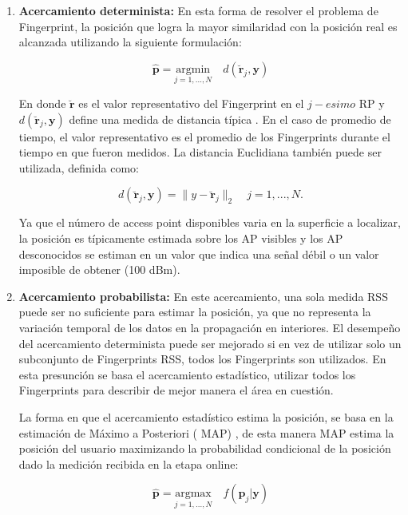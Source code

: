 \begin{enumerate}
\item \textbf{Acercamiento determinista:} En esta forma de resolver el problema de Fingerprint, la posición que logra la mayor similaridad con la posición real es alcanzada utilizando la siguiente formulación:

\begin{equation}
\hat{\textbf{p}} = \underset{j=1,...,N}{\mathrm{argmin}} \quad d( \breve{\textbf{r}}_{j}, \textbf{y})
\end{equation}

En donde \(\breve{\textbf{r}}\) es el valor representativo del Fingerprint en el \(j-esimo\) RP \citep{832252} y \(d( \breve{\textbf{r}}_{j}, \textbf{y}) \) define una medida de distancia típica \citep{6817920}. En el caso de promedio de tiempo, el valor representativo es el promedio de los Fingerprints durante el tiempo en que fueron medidos. La distancia Euclidiana también puede ser utilizada, definida como: 

\begin{equation}
d( \breve{\textbf{r}}_{j}, \textbf{y}) = \lVert y - \breve{\textbf{r}}_{j} \rVert_{2} \quad j = 1,..., N.
\end{equation}
   

Ya que el número de access point disponibles  varia en la superficie a localizar, la posición es típicamente estimada sobre los AP visibles y los AP desconocidos se estiman en un valor que indica una señal débil o un valor imposible de obtener (100 dBm).

\item \textbf{Acercamiento probabilista:} En este acercamiento, una sola medida RSS puede ser no suficiente para estimar la posición, ya que no representa la variación temporal de los datos en la propagación en interiores. El desempeño del acercamiento determinista puede ser mejorado si en vez de utilizar solo un subconjunto de Fingerprints RSS, todos los Fingerprints son utilizados. En esta presunción se basa el acercamiento estadístico, utilizar todos los Fingerprints para describir de mejor manera el área en cuestión.

La forma en que el acercamiento estadístico estima la posición, se basa en la estimación de Máximo a Posteriori ( MAP) \citep{4907834}, de esta manera MAP estima la posición del usuario maximizando la probabilidad condicional de la posición dado la medición recibida en la etapa online:

\begin{equation}
\hat{\textbf{p}} = \underset{j=1,...,N}{\mathrm{argmax}} \quad f( \textbf{p}_{j} \vert \textbf{y})
\end{equation}


\end{enumerate}
